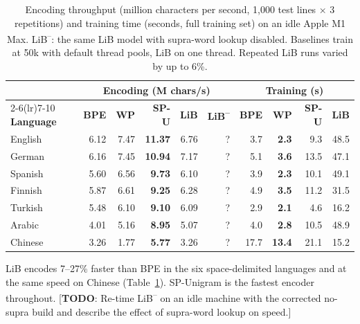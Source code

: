 \documentclass[pdflatex,sn-apa]{sn-jnl}
\newcommand{\todo}[1]{\textcolor{todocolor}{[\textbf{TODO}: #1]}}
\begin{document}
\begin{table}[t]
\centering
\small
\begin{tabular}{lrrrrrrrrr}
\toprule
 & \multicolumn{5}{c}{\textbf{Encoding (M chars/s)}} & \multicolumn{4}{c}{\textbf{Training (s)}} \\
\cmidrule(lr){2-6}\cmidrule(lr){7-10}
\textbf{Language} & \textbf{BPE} & \textbf{WP} & \textbf{SP-U} & \textbf{LiB} & \textbf{LiB\textsuperscript{--}} & \textbf{BPE} & \textbf{WP} & \textbf{SP-U} & \textbf{LiB} \\
\midrule
English  & 6.12 & 7.47 & \textbf{11.37} & 6.76 & \textcolor{todocolor}{?} & 3.7 & \textbf{2.3} & 9.3 & 48.5 \\
German   & 6.16 & 7.45 & \textbf{10.94} & 7.17 & \textcolor{todocolor}{?} & 5.1 & \textbf{3.6} & 13.5 & 47.1 \\
Spanish  & 5.60 & 6.56 &  \textbf{9.73} & 6.10 & \textcolor{todocolor}{?} & 3.9 & \textbf{2.3} & 10.1 & 49.1 \\
Finnish  & 5.87 & 6.61 &  \textbf{9.25} & 6.28 & \textcolor{todocolor}{?} & 4.9 & \textbf{3.5} & 11.2 & 31.5 \\
Turkish  & 5.48 & 6.10 &  \textbf{9.10} & 6.09 & \textcolor{todocolor}{?} & 2.9 & \textbf{2.1} & 4.6 & 16.2 \\
Arabic   & 4.01 & 5.16 &  \textbf{8.95} & 5.07 & \textcolor{todocolor}{?} & 4.0 & \textbf{2.8} & 10.5 & 48.9 \\
Chinese  & 3.26 & 1.77 &  \textbf{5.77} & 3.26 & \textcolor{todocolor}{?} & 17.7 & \textbf{13.4} & 21.1 & 15.2 \\
\bottomrule
\end{tabular}
\caption{Encoding throughput (million characters per second, 1,000 test
lines $\times$ 3 repetitions) and training time (seconds, full training set)
on an idle Apple M1 Max. LiB\textsuperscript{--}: the same LiB model with supra-word
lookup disabled. Baselines train at 50k with default thread pools, LiB on
one thread. Repeated LiB runs varied by up to 6\%.}
\label{tab:speed}
\end{table}

LiB encodes 7--27\% faster than BPE in the six space-delimited languages
and at the same speed on Chinese (Table~\ref{tab:speed}).
SP-Unigram is the fastest encoder throughout.
\todo{Re-time LiB\textsuperscript{--} on an idle machine with the corrected no-supra
build and describe the effect of supra-word lookup on speed.}
\end{document}
